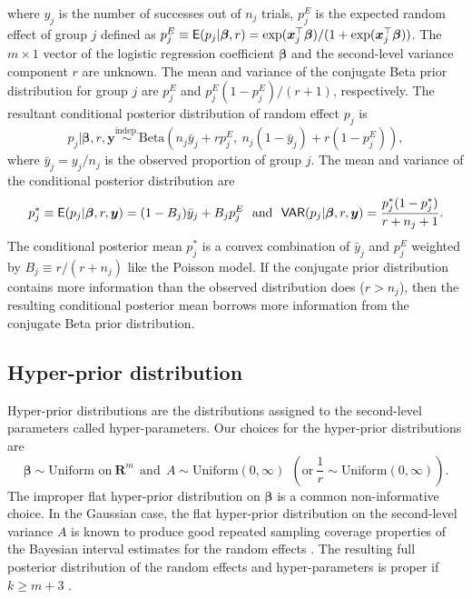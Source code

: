 \documentclass[article]{jss}
\begin{document}
where $y_{j}$  is the number of successes  out of $n_{j}$ trials, $p^E_j$ is the expected random effect  of group $j$ defined as $p^E_j\equiv \mathsf{E}(p_j\vert \boldsymbol{\beta}, r)=\exp(\boldsymbol{x}_j^\top\boldsymbol{\beta})/(1+\exp(\boldsymbol{x}_j^\top\boldsymbol{\beta}))$. The $m\times 1$ vector of the logistic regression coefficient $\boldsymbol{\beta}$ and the second-level variance component $r$ are unknown. The mean and variance of the conjugate Beta prior distribution for group $j$ are $p^E_j$ and $p^E_j(1-p^E_j)/(r+1)$, respectively.  The resultant conditional posterior distribution of random effect $p_j$  is
\begin{equation} \label{beta_post}
p_{j}\vert  \boldsymbol{\beta}, r, \boldsymbol{y} \stackrel{\textrm{indep.}}{\sim}\textrm{Beta}(n_{j}\bar{y}_{j}+rp^E_j,~n_{j}(1-\bar{y}_{j})+r(1-p^E_j)),
\end{equation}
where $\bar{y}_j=y_j/n_j$ is the observed proportion of group $j$. The mean and variance of the conditional posterior distribution are
\begin{equation}\label{betapost_mean_var}
p_j^\ast\equiv \mathsf{E}(p_j\vert \boldsymbol{\beta}, r, \boldsymbol{y} )=(1-B_{j})\bar{y}_{j} + B_{j}p^E_j~~\textrm{and}~~\mathsf{VAR}(p_j\vert  \boldsymbol{\beta}, r,  \boldsymbol{y})=\frac{p_j^\ast(1-p_j^\ast)}{r+n_j+1}.
\end{equation}
The conditional posterior mean $p_j^\ast$ is  a convex combination of $\bar{y}_{j}$ and $p^E_j$ weighted by $B_j\equiv r / (r + n_j)$ like the Poisson model.  If the conjugate prior distribution contains more information than the observed distribution does ($r>n_j$), then the resulting conditional posterior mean borrows more information from the conjugate Beta prior distribution.

\subsection[Hyper-prior distributions]{Hyper-prior distribution}
Hyper-prior distributions are the distributions assigned to the second-level parameters called hyper-parameters. Our choices for the hyper-prior distributions are
\begin{equation}\label{eq:hyper}
\boldsymbol{\beta} \sim \textrm{Uniform on}~ \textbf{R}^{m}~~\textrm{and}~~A \sim \textrm{Uniform}(0, \infty) ~~(\textrm{or} ~\frac{1}{r}\sim \textrm{Uniform}(0, \infty)).
\end{equation}
The improper flat hyper-prior distribution on $\boldsymbol{\beta}$ is a common non-informative choice.  In the Gaussian case, the flat hyper-prior distribution on the second-level variance $A$ is known to produce good repeated sampling coverage properties of the Bayesian interval estimates for the random effects \citep{tang2011, morris2012, kelly2014advances}. The resulting full posterior distribution of the random effects and hyper-parameters is proper if $k\ge m+3$ \citep{tang2011, kelly2014advances}. 
\end{document}
